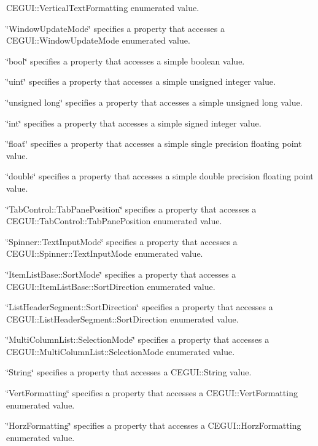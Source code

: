 \begin{DoxyItemize}
C\+E\+G\+U\+I\+::\+Vertical\+Text\+Formatting enumerated value. \item {\ttfamily \char`\"{}\+Window\+Update\+Mode\char`\"{}} specifies a property that accesses a C\+E\+G\+U\+I\+::\+Window\+Update\+Mode enumerated value. \item {\ttfamily \char`\"{}bool\char`\"{}} specifies a property that accesses a simple boolean value. \item {\ttfamily \char`\"{}uint\char`\"{}} specifies a property that accesses a simple unsigned integer value. \item {\ttfamily \char`\"{}unsigned long\char`\"{}} specifies a property that accesses a simple unsigned long value. \item {\ttfamily \char`\"{}int\char`\"{}} specifies a property that accesses a simple signed integer value. \item {\ttfamily \char`\"{}float\char`\"{}} specifies a property that accesses a simple single precision floating point value. \item {\ttfamily \char`\"{}double\char`\"{}} specifies a property that accesses a simple double precision floating point value. \item {\ttfamily \char`\"{}\+Tab\+Control\+::\+Tab\+Pane\+Position\char`\"{}} specifies a property that accesses a C\+E\+G\+U\+I\+::\+Tab\+Control\+::\+Tab\+Pane\+Position enumerated value. \item {\ttfamily \char`\"{}\+Spinner\+::\+Text\+Input\+Mode\char`\"{}} specifies a property that accesses a C\+E\+G\+U\+I\+::\+Spinner\+::\+Text\+Input\+Mode enumerated value. \item {\ttfamily \char`\"{}\+Item\+List\+Base\+::\+Sort\+Mode\char`\"{}} specifies a property that accesses a C\+E\+G\+U\+I\+::\+Item\+List\+Base\+::\+Sort\+Direction enumerated value. \item {\ttfamily \char`\"{}\+List\+Header\+Segment\+::\+Sort\+Direction\char`\"{}} specifies a property that accesses a C\+E\+G\+U\+I\+::\+List\+Header\+Segment\+::\+Sort\+Direction enumerated value. \item {\ttfamily \char`\"{}\+Multi\+Column\+List\+::\+Selection\+Mode\char`\"{}} specifies a property that accesses a C\+E\+G\+U\+I\+::\+Multi\+Column\+List\+::\+Selection\+Mode enumerated value. \item {\ttfamily \char`\"{}\+String\char`\"{}} specifies a property that accesses a C\+E\+G\+U\+I\+::\+String value. \item {\ttfamily \char`\"{}\+Vert\+Formatting\char`\"{}} specifies a property that accesses a C\+E\+G\+U\+I\+::\+Vert\+Formatting enumerated value. \item {\ttfamily \char`\"{}\+Horz\+Formatting\char`\"{}} specifies a property that accesses a C\+E\+G\+U\+I\+::\+Horz\+Formatting enumerated value.\end{DoxyItemize}
